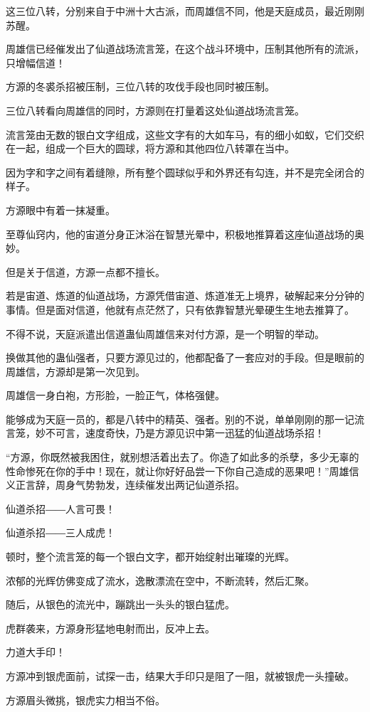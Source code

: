 \begin{this_body}
这三位八转，分别来自于中洲十大古派，而周雄信不同，他是天庭成员，最近刚刚苏醒。

周雄信已经催发出了仙道战场流言笼，在这个战斗环境中，压制其他所有的流派，只增幅信道！

方源的冬裘杀招被压制，三位八转的攻伐手段也同时被压制。

三位八转看向周雄信的同时，方源则在打量着这处仙道战场流言笼。

流言笼由无数的银白文字组成，这些文字有的大如车马，有的细小如蚁，它们交织在一起，组成一个巨大的圆球，将方源和其他四位八转罩在当中。

因为字和字之间有着缝隙，所有整个圆球似乎和外界还有勾连，并不是完全闭合的样子。

方源眼中有着一抹凝重。

至尊仙窍内，他的宙道分身正沐浴在智慧光晕中，积极地推算着这座仙道战场的奥妙。

但是关于信道，方源一点都不擅长。

若是宙道、炼道的仙道战场，方源凭借宙道、炼道准无上境界，破解起来分分钟的事情。但是面对信道，他就有点茫然了，只有依靠智慧光晕硬生生地去推算了。

不得不说，天庭派遣出信道蛊仙周雄信来对付方源，是一个明智的举动。

换做其他的蛊仙强者，只要方源见过的，他都配备了一套应对的手段。但是眼前的周雄信，方源却是第一次见到。

周雄信一身白袍，方形脸，一脸正气，体格强健。

能够成为天庭一员的，都是八转中的精英、强者。别的不说，单单刚刚的那一记流言笼，妙不可言，速度奇快，乃是方源见识中第一迅猛的仙道战场杀招！

“方源，你既然被我困住，就别想活着出去了。你造了如此多的杀孽，多少无辜的性命惨死在你的手中！现在，就让你好好品尝一下你自己造成的恶果吧！”周雄信义正言辞，周身气势勃发，连续催发出两记仙道杀招。

仙道杀招――人言可畏！

仙道杀招――三人成虎！

顿时，整个流言笼的每一个银白文字，都开始绽射出璀璨的光辉。

浓郁的光辉仿佛变成了流水，逸散漂流在空中，不断流转，然后汇聚。

随后，从银色的流光中，蹦跳出一头头的银白猛虎。

虎群袭来，方源身形猛地电射而出，反冲上去。

力道大手印！

方源冲到银虎面前，试探一击，结果大手印只是阻了一阻，就被银虎一头撞破。

方源眉头微挑，银虎实力相当不俗。


\end{this_body}
